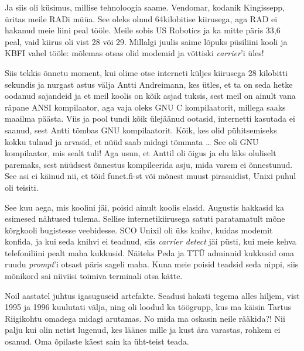 Ja siis oli küsimus, millise tehnoloogia saame. Vendomar, kodanik 
Kingissepp, üritas meile 
RADi müüa. See oleks olnud 64kilobitise kiirusega, aga RAD ei hakanud 
meie liini peal tööle. Meile sobis US Robotics ja 
ka mitte päris 33,6 peal, vaid kiirus oli vist 28 või 29. Millalgi juulis saime lõpuks püsiliini kooli ja KBFI vahel tööle: 
mõlemas otsas olid modemid ja võttiski \emph{carrier}'i üles! 

Siis tekkis õnnetu moment, kui olime otse interneti küljes 
kiirusega 28 kilobitti sekundis ja nurgast astus välja Antti 
Andreimann, kes ütles, et ta on seda hetke 
oodanud sajandeid ja et meil koolis on kõik asjad tuksis, sest meil on ainult 
vana räpane ANSI kompilaator, aga vaja oleks GNU C kompilaatorit, millega saaks 
maailma päästa. Viis ja pool tundi kõik ülejäänud ootasid, internetti kasutada 
ei saanud, sest Antti tõmbas GNU kompilaatorit. Kõik, kes olid pühitsemiseks 
kokku tulnud ja arvasid, et nüüd saab midagi tõmmata \ldots {} See oli GNU 
kompilaator, mis sealt tuli! Aga usun, et Anttil oli õigus 
ja elu läks oluliselt paremaks, sest nüüdsest õnnestus kompileerida asju, mida 
varem ei õnnestunud. See asi ei käinud nii, et tõid 
funet.fi-st või mõnest muust pirasaidist, Unixi puhul oli 
teisiti. 

See kuu aega, mis koolini jäi, poisid ainult koolis elasid. Augustis 
hakkasid ka esimesed nähtused tulema. Sellise internetikiirusega satuti paratamatult mõne kõrgkooli bugistesse 
veebidesse. SCO Unixil oli üks 
knihv, kuidas modemit konfida, ja kui seda knihvi ei teadnud, siis 
\emph{carrier detect} jäi püsti, kui meie kehva telefoniliini pealt maha 
kukkusid. Näiteks Peda ja TTÜ adminnid kukkusid oma ruudu 
\emph{prompt}'i otsast päris sageli maha. Kuna meie poisid teadsid seda 
nippi, siis mõnikord sai niiviisi toimiva terminali otsa kätte. 

Noil aastatel juhtus igasuguseid artefakte. Seadusi hakati tegema alles hiljem, vist 1995 
ja 1996 kuulutati välja, ning oli loodud ka töögrupp, kus ma käisin 
Tartus Riigikohtu omadega midagi arutamas. No mida ma oskasin 
neile rääkida?! Nii palju kui olin netist lugenud, kes läänes mille ja kust 
ära varastas, rohkem ei osanud. Oma õpilaste käest sain ka üht-teist teada.

